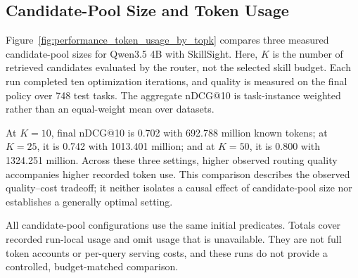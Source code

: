 \subsection{Candidate-Pool Size and Token Usage}
\label{app:candidate-pool-tokens}
Figure~\ref{fig:performance_token_usage_by_topk} compares three measured candidate-pool sizes for Qwen3.5 4B with SkillSight. Here, $K$ is the number of retrieved candidates evaluated by the router, not the selected skill budget. Each run completed ten optimization iterations, and quality is measured on the final policy over 748 test tasks. The aggregate nDCG@10 is task-instance weighted rather than an equal-weight mean over datasets.

At $K=10$, final nDCG@10 is 0.702 with 692.788 million known tokens; at $K=25$, it is 0.742 with 1013.401 million; and at $K=50$, it is 0.800 with 1324.251 million. Across these three settings, higher observed routing quality accompanies higher recorded token use. This comparison describes the observed quality--cost tradeoff; it neither isolates a causal effect of candidate-pool size nor establishes a generally optimal setting.

All candidate-pool configurations use the same initial predicates. Totals cover recorded run-local usage and omit usage that is unavailable. They are not full token accounts or per-query serving costs, and these runs do not provide a controlled, budget-matched comparison.


